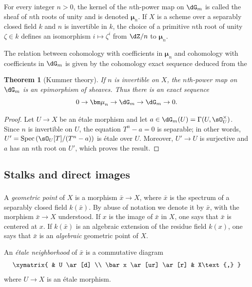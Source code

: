 \documentclass[12pt,oneside,english]{smfbook}
\DeclareMathOperator{\spec}{Spec}
\newcommand{\dmu}{{\bm\mu}}
\newtheorem{theorem}[subsubsection]{Theorem}
\begin{document}
For every integer $n>0$, the kernel of the $n$th-power map on $\dG_m$ is called the sheaf of $n$th roots of unity and is denoted $\dmu_n$. If $X$ is a scheme over a separably closed field $k$ and $n$ is invertible in $k$, the choice of a primitive $n$th root of unity $\zeta\in k$ defines an isomorphism $i\mapsto\zeta^i$ from $\dZ/n$ to $\dmu_n$.

The relation between cohomology with coefficients in $\dmu_n$ and cohomology with coefficients in $\dG_m$ is given by the cohomology exact sequence deduced from the

\begin{theorem}[Kummer theory]\label{I:2-2-5}
If $n$ is invertible on $X$, the $n$th-power map on $\dG_m$ is an epimorphism of sheaves. Thus there is an exact sequence
\[
  0 \to \dmu_n \to \dG_m \to \dG_m \to 0\text{.}
\]
\end{theorem}
\begin{proof}
Let $U\to X$ be an étale morphism and let $a\in\dG_m(U)=\Gamma(U,\sO_U^\times)$. Since $n$ is invertible on $U$, the equation $T^n-a=0$ is separable; in other words, $U'=\spec\left(\sO_U[T]/(T^n-a)\right)$ is étale over $U$. Moreover, $U'\to U$ is surjective and $a$ has an $n$th root on $U'$, which proves the result.
\end{proof}

\subsection{Stalks and direct images}\label{I:2-3}

\subsubsection{}\label{I:2-3-1}

A \emph{geometric point} of $X$ is a morphism $\bar x\to X$, where $\bar x$ is the spectrum of a separably closed field $k(\bar x)$. By abuse of notation we denote it by $\bar x$, with the morphism $\bar x\to X$ understood. If $x$ is the image of $\bar x$ in $X$, one says that $\bar x$ is centered at $x$. If $k(\bar x)$ is an algebraic extension of the residue field $k(x)$, one says that $\bar x$ is an \emph{algebraic} geometric point of $X$.

An \emph{étale neighborhood} of $\bar x$ is a commutative diagram
\[\xymatrix{
  & U \ar[d] \\
  \bar x \ar[ur] \ar[r]
  & X\text{,}
}\]
where $U\to X$ is an étale morphism.
\end{document}
